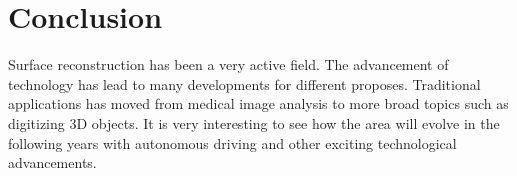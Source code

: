 \documentclass[11pt]{article}
\begin{document}
\section{Conclusion}

Surface reconstruction has been a very active field. The advancement of technology has lead to many developments for different proposes. Traditional applications has moved from medical image analysis to more broad topics such as digitizing 3D objects. It is very interesting to see how the area will evolve in the following years with autonomous driving and other exciting technological advancements.





\end{document}
